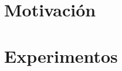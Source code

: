 
\inputminted{haskell}{codigo/haskell/test-string-matching.hs}



\section{Motivación} %
\section{Experimentos} %